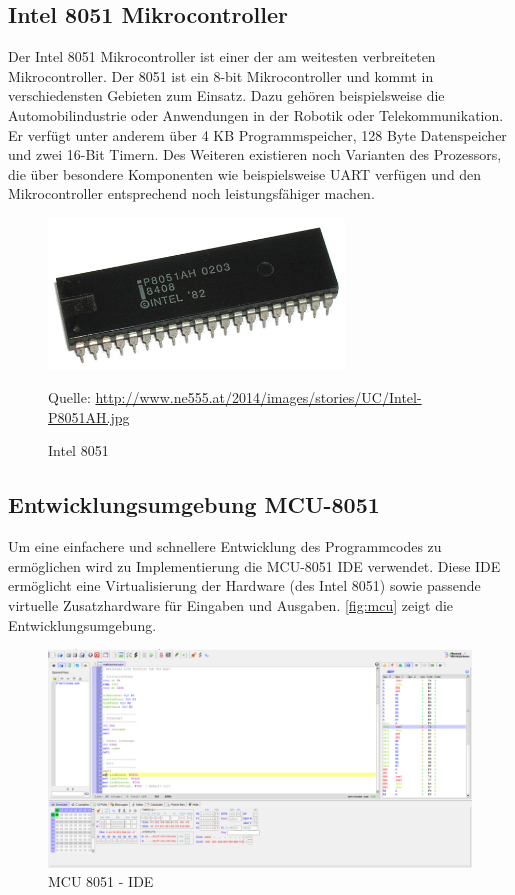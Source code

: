 \documentclass[a4paper, 12pt]{scrartcl}
\newcommand*{\quelle}{%
  \footnotesize Quelle: 
}
\begin{document}
\begin{onehalfspace}
\subsection{Intel 8051 Mikrocontroller}
Der Intel 8051 Mikrocontroller ist einer der am weitesten verbreiteten Mikrocontroller. Der 8051 ist ein 8-bit Mikrocontroller und kommt in verschiedensten Gebieten zum Einsatz. Dazu gehören beispielsweise die Automobilindustrie oder Anwendungen in der Robotik oder Telekommunikation. Er verfügt unter anderem über 4 KB Programmspeicher, 128 Byte Datenspeicher und zwei 16-Bit Timern. Des Weiteren existieren noch Varianten des Prozessors, die über besondere Komponenten wie beispielsweise UART verfügen und den Mikrocontroller entsprechend noch leistungsfähiger machen.
\begin{figure}[h]
\centering
\includegraphics[width=0.7\textwidth]{8051.jpg}
\caption{Intel 8051}
\quelle\url{http://www.ne555.at/2014/images/stories/UC/Intel-P8051AH.jpg} 
\label{fig:mcu}
\end{figure}

\subsection{Entwicklungsumgebung MCU-8051}
Um eine einfachere und schnellere Entwicklung des Programmcodes zu ermöglichen wird zu Implementierung die MCU-8051 IDE verwendet. Diese IDE ermöglicht eine Virtualisierung der Hardware (des Intel 8051) sowie passende virtuelle Zusatzhardware für Eingaben und Ausgaben. \autoref{fig:mcu} zeigt die Entwicklungsumgebung.
\begin{figure}[h]
\centering
\includegraphics[width=\textwidth]{mcu.png}
\caption{MCU 8051 - IDE}
\label{fig:mcu}
\end{figure}


\end{onehalfspace}
\end{document}
